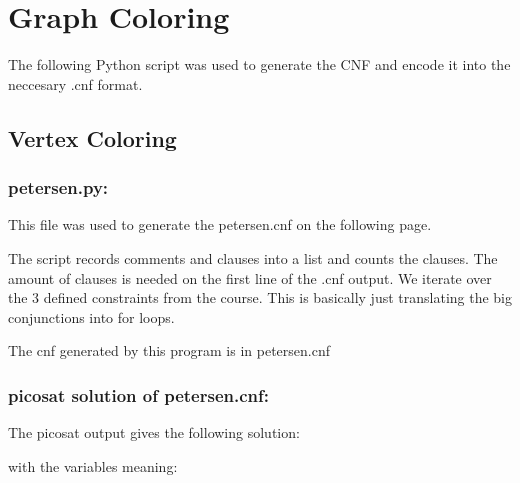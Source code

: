 \documentclass{../base/base}
\begin{document}



\section{Graph Coloring}
The following Python script was used to generate the CNF and encode it into the neccesary .cnf format.

\subsection{Vertex Coloring}
\subsubsection{petersen.py:}


This file was used to generate the petersen.cnf on the following page.

The script records comments and clauses into a list and counts the clauses. The amount of clauses is needed on the first line of the .cnf output.
We iterate over the 3 defined constraints from the course. This is basically just translating the big conjunctions into for loops.


The cnf generated by this program is in petersen.cnf

\subsubsection{picosat solution of petersen.cnf:}
The picosat output gives the following solution:

with the variables meaning:

\end{document}
